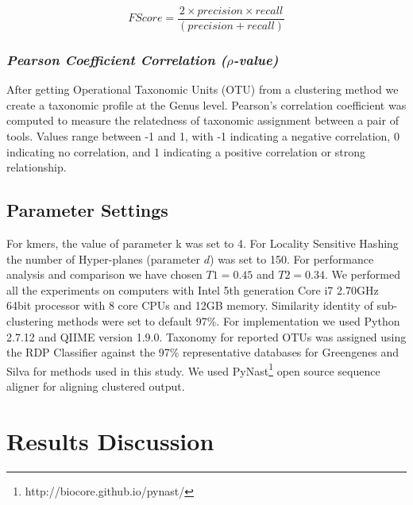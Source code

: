 \documentclass[10pt, conference, compsocconf]{IEEEtran}
\begin{document}
\begin{equation}
F Score = \frac{2 \times precision \times recall}{(precision + recall)}
\end{equation}

\subsubsection{\textit{Pearson Coefficient Correlation ($\rho$-value)}}
After getting Operational Taxonomic Units (OTU) from a clustering method we create a taxonomic profile at the Genus level. Pearson’s correlation coefficient was computed to measure the relatedness of taxonomic assignment between a pair of tools. Values range between -1 and 1, with -1 indicating a negative correlation, 0 indicating no correlation, and 1 indicating a positive correlation or strong relationship.

\subsection{\textbf{Parameter Settings}}
For kmers, the value of parameter k was set to 4. For Locality Sensitive Hashing the number of Hyper-planes (parameter $d$) was set to 150. For performance analysis and comparison we have chosen $T1=0.45$ and $T2=0.34$. We performed all the experiments on computers with Intel 5th generation Core i7 2.70GHz 64bit processor with 8 core CPUs and 12GB memory. Similarity identity of sub-clustering methods were set to default 97\%. For implementation we used Python 2.7.12 and QIIME \cite{MARQiime} version 1.9.0. Taxonomy for reported OTUs was assigned using the RDP Classifier \cite{MARRdp} against the 97\% representative databases for Greengenes \cite{MARGreen1} and Silva \cite{MARSilva} for methods used in this study. We used PyNast\footnote{http://biocore.github.io/pynast/} open source sequence aligner for aligning clustered output. 

\section{Results Discussion} 
\label{sec:Results}
\end{document}
